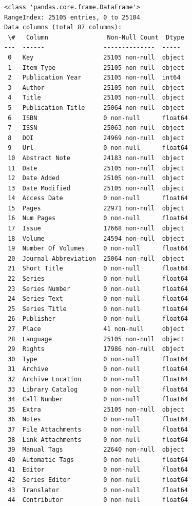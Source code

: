 \documentclass[11pt]{article}
\begin{document}
    \begin{Verbatim}[commandchars=\\\{\}]
<class 'pandas.core.frame.DataFrame'>
RangeIndex: 25105 entries, 0 to 25104
Data columns (total 87 columns):
 \#   Column                Non-Null Count  Dtype
---  ------                --------------  -----
 0   Key                   25105 non-null  object
 1   Item Type             25105 non-null  object
 2   Publication Year      25105 non-null  int64
 3   Author                25105 non-null  object
 4   Title                 25105 non-null  object
 5   Publication Title     25064 non-null  object
 6   ISBN                  0 non-null      float64
 7   ISSN                  25063 non-null  object
 8   DOI                   24969 non-null  object
 9   Url                   0 non-null      float64
 10  Abstract Note         24183 non-null  object
 11  Date                  25105 non-null  object
 12  Date Added            25105 non-null  object
 13  Date Modified         25105 non-null  object
 14  Access Date           0 non-null      float64
 15  Pages                 22971 non-null  object
 16  Num Pages             0 non-null      float64
 17  Issue                 17668 non-null  object
 18  Volume                24594 non-null  object
 19  Number Of Volumes     0 non-null      float64
 20  Journal Abbreviation  25064 non-null  object
 21  Short Title           0 non-null      float64
 22  Series                0 non-null      float64
 23  Series Number         0 non-null      float64
 24  Series Text           0 non-null      float64
 25  Series Title          0 non-null      float64
 26  Publisher             0 non-null      float64
 27  Place                 41 non-null     object
 28  Language              25105 non-null  object
 29  Rights                17986 non-null  object
 30  Type                  0 non-null      float64
 31  Archive               0 non-null      float64
 32  Archive Location      0 non-null      float64
 33  Library Catalog       0 non-null      float64
 34  Call Number           0 non-null      float64
 35  Extra                 25105 non-null  object
 36  Notes                 0 non-null      float64
 37  File Attachments      0 non-null      float64
 38  Link Attachments      0 non-null      float64
 39  Manual Tags           22640 non-null  object
 40  Automatic Tags        0 non-null      float64
 41  Editor                0 non-null      float64
 42  Series Editor         0 non-null      float64
 43  Translator            0 non-null      float64
 44  Contributor           0 non-null      float64

\end{Verbatim}
\end{document}
